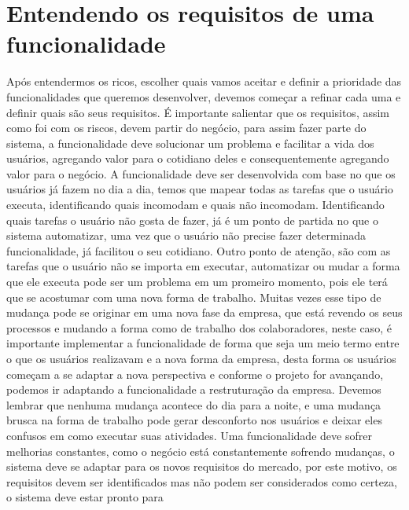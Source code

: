     \section{Entendendo os requisitos de uma funcionalidade}
      Após entendermos os ricos, escolher quais vamos aceitar e definir a prioridade
      das funcionalidades que queremos desenvolver, devemos começar a refinar cada
      uma e definir quais são seus requisitos. É importante salientar que os
      requisitos, assim como foi com os riscos, devem partir do negócio, para assim
      fazer parte do sistema, a funcionalidade deve solucionar um problema e facilitar
      a vida dos usuários, agregando valor para o cotidiano deles e consequentemente
      agregando valor para o negócio. \newline
      A funcionalidade deve ser desenvolvida com base no que os usuários já fazem
      no dia a dia, temos que mapear todas as tarefas que o usuário executa,
      identificando quais incomodam e quais não incomodam. Identificando quais tarefas
      o usuário não gosta de fazer, já é um ponto de partida no que o sistema
      automatizar, uma vez que o usuário não precise fazer determinada funcionalidade,
      já facilitou o seu cotidiano. Outro ponto de atenção, são com as tarefas que
      o usuário não se importa em executar, automatizar ou mudar a forma que ele
      executa pode ser um problema em um promeiro momento, pois ele terá que se
      acostumar com uma nova forma de trabalho. Muitas vezes esse tipo de mudança
      pode se originar em uma nova fase da empresa, que está revendo os seus processos
      e mudando a forma como de trabalho dos colaboradores, neste caso, é importante
      implementar a funcionalidade de forma que seja um meio termo entre o que os
      usuários realizavam e a nova forma da empresa, desta forma os usuários
      começam a se adaptar a nova perspectiva e conforme o projeto for avançando,
      podemos ir adaptando a funcionalidade a restruturação da empresa. Devemos
      lembrar que nenhuma mudança acontece do dia para a noite, e uma mudança
      brusca na forma de trabalho pode gerar desconforto nos usuários e deixar eles
      confusos em como executar suas atividades. \newline
      Uma funcionalidade deve sofrer melhorias constantes, como o negócio está
      constantemente sofrendo mudanças, o sistema deve se adaptar para os novos
      requisitos do mercado, por este motivo, os requisitos devem ser identificados
      mas não podem ser considerados como certeza, o sistema deve estar pronto para
